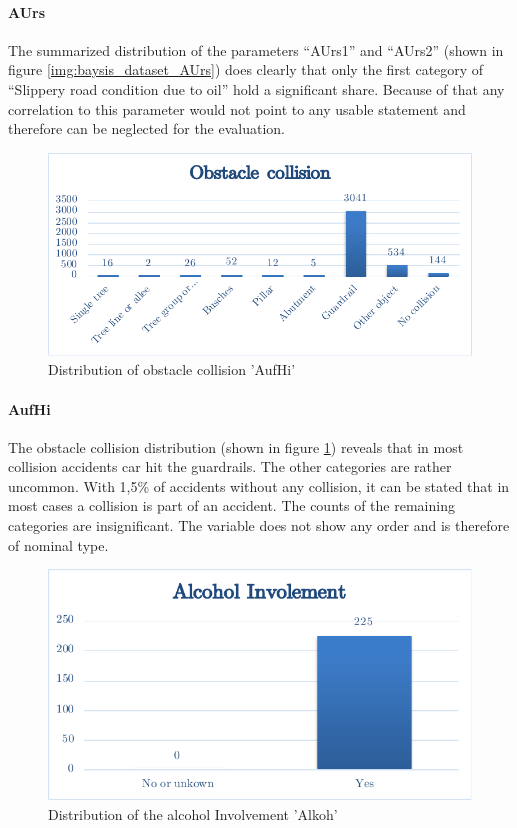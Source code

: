 \documentclass[a4paper,12pt]{report}
\begin{document}
\paragraph{AUrs}
The summarized distribution of the parameters “AUrs1” and “AUrs2” (shown in figure \ref{img:baysis_dataset_AUrs}) does clearly that only the first category of “Slippery road condition due to oil” hold a significant share. Because of that any correlation to this parameter would not point to any usable statement and therefore can be neglected for the evaluation.

\begin{figure}[]
	\centering
	\includegraphics[scale=0.6]{./assets/baysis_dataset_Aufhi.pdf}
	\caption{Distribution of obstacle collision 'AufHi'}
	\label{img:baysis_dataset_Aufhi}
\end{figure}

\paragraph{AufHi}
The obstacle collision distribution (shown in figure \ref{img:baysis_dataset_Aufhi}) reveals that in most collision accidents car hit the guardrails. The other categories are rather uncommon. With 1,5\% of accidents without any collision, it can be stated that in most cases a collision is part of an accident. The counts of the remaining categories are insignificant. The variable does not show any order and is therefore of nominal type.

\begin{figure}[h]
	\centering
	\includegraphics[scale=0.6]{./assets/baysis_dataset_Alkoh.pdf}
	\caption{Distribution of the alcohol Involvement 'Alkoh'}
	\label{img:baysis_dataset_Alkoh}
\end{figure}
\end{document}
